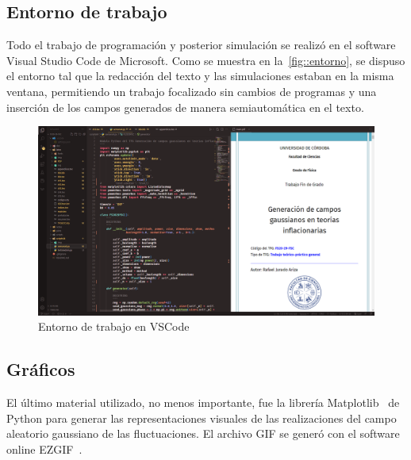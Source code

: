 \subsection{Entorno de trabajo}
Todo el trabajo de programación y posterior simulación se realizó en el software Visual Studio Code de Microsoft. Como se muestra en la~\autoref{fig::entorno}, se dispuso el entorno tal que la redacción del texto y las simulaciones estaban en la misma ventana, permitiendo un trabajo focalizado sin cambios de programas y una inserción de los campos generados de manera semiautomática en el texto.
\begin{figure}[h]
    \centering
    \includegraphics[width=\textwidth]{img/entorno.png}
    \caption{Entorno de trabajo en VSCode}
    \label{fig::entorno}
\end{figure}
\subsection{Gráficos}
El último material utilizado, no menos importante, fue la librería Matplotlib~\cite{Hunter2007} de Python para generar las representaciones visuales de las realizaciones del campo aleatorio gaussiano de las fluctuaciones. El archivo GIF se generó con el software online EZGIF~\cite{ltd2012}.